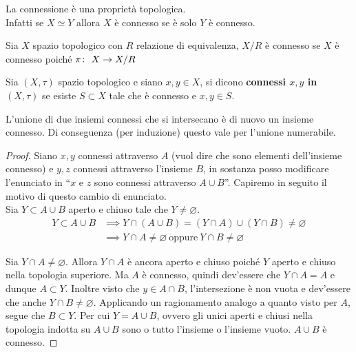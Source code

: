 \begin{corollary}
	La connessione è una proprietà topologica. \\ Infatti se $X \simeq Y$ allora $X$ è connesso se è solo $Y$ è connesso. 
\end{corollary}

\begin{corollary}
	Sia $X$ spazio topologico con $R$ relazione di equivalenza, $X/R$ è connesso se $X$ è connesso poiché $\pi \colon\ X \rightarrow X/R$
\end{corollary} 

\begin{definition}
	Sia $(X, \tau)$ spazio topologico e siano $x, y \in X$, si dicono \textbf{connessi $x, y$ in $(X, \tau)$} se esiste $S \subset X$ tale che è connesso e $x, y\in S$.
\end{definition} 

\begin{theorem}
	L'unione di due insiemi connessi che si intersecano è di nuovo un insieme connesso. Di conseguenza (per induzione) questo vale per l'unione numerabile.
\end{theorem}
\begin{proof}
	Siano $x,y$ connessi attraverso $A$ (vuol dire che sono elementi dell'insieme connesso) e $y,z$ connessi attraverso l'insieme $B$, in sostanza posso modificare l'enunciato in \enquote{$x$ e $z$ sono connessi attraverso $A \cup B$}. Capiremo in seguito il motivo di questo cambio di enunciato.\\
	Sia $Y \subset A \cup B$ aperto e chiuso tale che $Y \neq \varnothing$.
	\begin{align*}
	Y \subset A \cup B & \implies Y \cap (A \cup B) = (Y\cap A)\cup (Y\cap B) \neq \varnothing\\
	& \implies Y \cap A \neq \varnothing \ \text{oppure} \ Y \cap B \neq \varnothing
	\end{align*}
	
	Sia $Y \cap A \neq \varnothing$. Allora $Y \cap A$ è ancora aperto e chiuso poiché $Y$ aperto e chiuso nella topologia superiore. Ma $A$ è connesso, quindi dev'essere che $Y \cap A = A$ e dunque $A \subset Y$. Inoltre visto che $y\in A \cap B$, l'intersezione è non vuota e dev'essere che anche $Y \cap B \neq \varnothing$. Applicando un ragionamento analogo a quanto visto per $A$, segue che $B \subset Y$. Per cui $Y = A \cup B$, ovvero gli unici aperti e chiusi nella topologia indotta su $A \cup B$ sono o tutto l'insieme o l'insieme vuoto. $A \cup B$ è connesso.
\end{proof}

